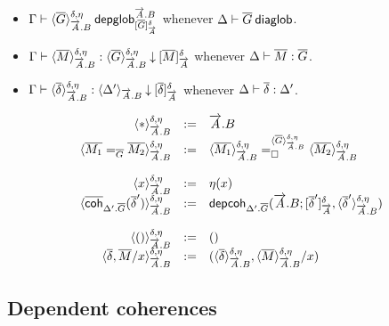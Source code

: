 \begin{itemize}
\item
$\wfdepglob{\Gamma}{\interpdepglob{\diag G}{\tel A.B}{\delta}{\eta}}{\tel A.B}
  {\interpglob{\diag G}{\tel A}{\delta}}$
whenever
$\wfdiaglob{\Delta}{\diag G}$.

\item
$\ofdepglob{\Gamma}{\interpdepglob{\diag M}{\tel A.B}{\delta}{\eta}}
 {\interpdepglob{\diag G}{\tel A.B}{\delta}{\eta}}
 {\interpglob{\diag M}{\tel A}{\delta}}$
whenever
$\ofdiaglob{\Delta}{\diag M}{\diag G}$.

\item
$\ofinterpdep{\Gamma}
  {\interpdepglob{\diag\delta}{\tel A.B}{\delta}{\eta}}{\Delta'}{\tel A.B}
  {\interpglob{\diag\delta}{\tel A}{\delta}}$
whenever
$\ofdiaglob{\Delta}{\diag\delta}{\Delta'}$.
\end{itemize}

\[
  \begin{array}{rcl}
    \interpdepglob{\diagbase}{\tel A.B}{\delta}{\eta} & := & \tel A.B \\
    \interpdepglob{\homj{\diag G}{\diag{M_1}}{\diag{M_2}}}
      {\tel A.B}{\delta}{\eta} & := &
    \dhomj
      {\interpdepglob{\diag G}{\tel A.B}{\delta}{\eta}}
      {\interpdepglob{\diag{M_1}}{\tel A.B}{\delta}{\eta}}
      {\interpdepglob{\diag{M_2}}{\tel A.B}{\delta}{\eta}}
      {\blank}
    \\\\

    \interpdepglob{x}{\tel A.B}{\delta}{\eta} & := & \eta(x) \\
    \interpdepglob
      {\diagcoh{\Delta'.\diag{G}}{\diag \delta'}}{\tel A.B}{\delta}{\eta} & := &
    \depcoh{\Delta'.\diag G}{\tel A.B}
      {\interpglob{\diag\delta'}{\tel A}{\delta}}
      {\interpdepglob{\diag\delta'}{\tel A.B}{\delta}{\eta}} \\\\

    \interpdepglob{()}{\tel A.B}{\delta}{\eta} & := & () \\
    \interpdepglob{\diag\delta,\diag M/x}{\tel A.B}{\delta}{\eta} & := &
    (\interpdepglob{\diag\delta}{\tel A.B}{\delta}{\eta},\interpdepglob{\diag
    M}{\tel A.B}{\delta}{\eta}/x)
  \end{array}
\]

\subsection{Dependent coherences}

